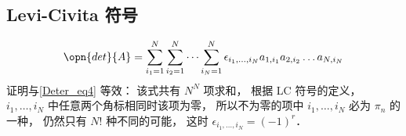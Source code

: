 \subsection{Levi-Civita 符号}
\begin{equation}
\opn{det}{A} = \sum_{i_1 = 1}^N \sum_{i_2 = 1}^N \dots \sum_{i_N = 1}^N \epsilon_{i_1, \dots, i_N} a_{1,i_1}a_{2,i_2}\dots a_{N,i_N}
\end{equation}
证明与\autoref{Deter_eq4} 等效： 该式共有 $N^N$ 项求和， 根据 LC 符号的定义， $i_1, \dots, i_N$ 中任意两个角标相同时该项为零， 所以不为零的项中 $i_1, \dots, i_N$ 必为 $\pi_n$ 的一种， 仍然只有 $N!$ 种不同的可能， 这时 $\epsilon_{i_1, \dots, i_N} = (-1)^{r}$．
